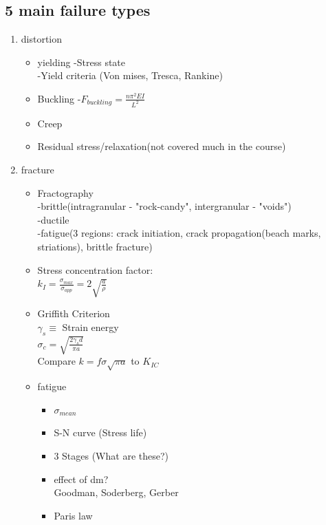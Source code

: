 \documentclass[11pt]{article}
\begin{document}
\subsection{5 main failure types}
\begin{enumerate}
    \item distortion    
    \begin{itemize}
        \item yielding
        -Stress state\\
        -Yield criteria (Von mises, Tresca, Rankine)
        \item Buckling
        -$F_{buckling}=\frac{n\pi^2EI}{L^2}$
        \item Creep
        \item Residual stress/relaxation(not covered much in the course)
    \end{itemize}
    \item fracture
    \begin{itemize}
        \item Fractography\\
        -brittle(intragranular - "rock-candy", intergranular - "voids")
        \\-ductile
        \\-fatigue(3 regions: crack initiation, crack propagation(beach marks, striations), brittle fracture)
        \item Stress concentration factor:
        \\
        $k_I=\frac{\sigma_{max}}{\sigma_{app}}=2\sqrt{\frac{a}{\rho}}$
        \item Griffith Criterion
        \\
        $\gamma_s\equiv$ Strain energy
        \\
        $\sigma_c=\sqrt{\frac{2\gamma_sd}{\pi a}}$
        \\
        Compare $k=f\sigma\sqrt{\pi a}$ to $K_{IC}$
        \item fatigue
        \begin{itemize}
            \item $\sigma_{mean}$
            \item S-N curve (Stress life)
            \item 3 Stages (What are these?)
            \item effect of dm?
            \\
            Goodman, Soderberg, Gerber
            \item Paris law
        \end{itemize}

\end{itemize}
\end{enumerate}
\end{document}
